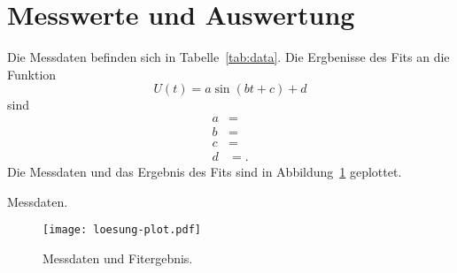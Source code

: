 



\section{Messwerte und Auswertung}

Die Messdaten befinden sich in Tabelle~\ref{tab:data}.
Die Ergbenisse des Fits an die Funktion
\begin{equation}
  U(t) = a \sin(b t + c) + d
\end{equation}
sind
\begin{align}
  a &=  \\
  b &=  \\
  c &=  \\
  d &=  .
\end{align}
Die Messdaten und das Ergebnis des Fits sind in Abbildung~\ref{fig:plot} geplottet.

\begin{table}
  \centering
  \caption{Messdaten.}
  \label{tab:data}
  
\end{table}

\begin{figure}
  \centering
  \texttt{[image: loesung-plot.pdf]}
  \caption{Messdaten und Fitergebnis.}
  \label{fig:plot}
\end{figure}


